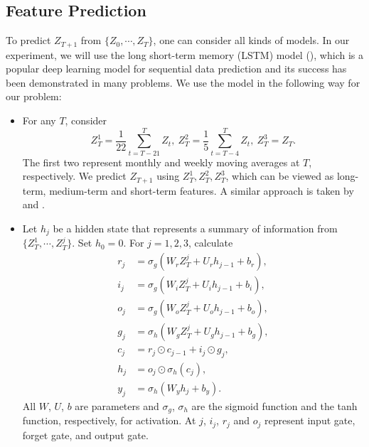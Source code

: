 \documentclass[11pt,a4paper]{article}
\theoremstyle{remark}
\begin{document}
\subsection{Feature Prediction}\label{sec:feature-pred}
To predict $Z_{T+1}$ from $\{Z_0,\cdots,Z_T\}$, one can consider all kinds of models. In our experiment, we will use the long short-term memory (LSTM) model (\cite{hochreiter1997long}), which is a popular deep learning model for sequential data prediction and its success has been demonstrated in many problems. We use the model in the following way for our problem: 
\begin{itemize}
	\item For any $T$, consider
	\begin{equation}
		Z_{T}^{1}=\frac{1}{22}\sum_{t=T-21}^{T} Z_{t},\ Z_{T}^{2}=\frac{1}{5}\sum_{t=T-4}^{T}Z_{t},\ Z_{T}^{3}=Z_{T}.
	\end{equation}
	The first two represent monthly and weekly moving averages at $T$, respectively. We predict $Z_{T+1}$ using $Z^1_T, Z^2_T, Z^3_T$, which can be viewed as long-term, medium-term and short-term features. A similar approach is taken by \cite{corsi2009simple} and \cite{chen2019forecasting}.
	
	 
	\item Let $h_j$ be a hidden state that represents a summary of information from $\{Z_T^1,\cdots,Z_T^j\}$. Set $h_{0}=0$. For $j=1,2,3$, calculate
	\begin{align}
		r_{j} &=\sigma_{g}\left(W_{r} Z_{T}^j+U_{r} h_{j-1}+b_{r}\right), \\
		i_{j} &=\sigma_{g}\left(W_{i} Z_{T}^j+U_{i} h_{j-1}+b_{i}\right), \\
		o_{j} &=\sigma_{g}\left(W_{o} Z_{T}^j+U_{o} h_{j-1}+b_{o}\right), \\
		g_{j} &=\sigma_{h}\left(W_{g} Z_{T}^j+U_{g} h_{j-1}+b_{g}\right), \\
		c_{j} &=r_{j} \odot c_{j-1}+i_{j} \odot g_{j},\\
		h_{j} &=o_{j} \odot \sigma_{h}\left(c_{j}\right),\\
		y_{j} &=\sigma_{h}\left(W_{y} h_{j}+b_{y}\right).
	\end{align}
	All $W$, $U$, $b$ are parameters and $\sigma_{g}$, $\sigma_{h}$ are the sigmoid function and the tanh function, respectively, for activation. At $j$, $i_{j}$, $r_{j}$ and $o_{j}$ represent input gate, forget gate, and output gate.


\end{itemize}
\end{document}
